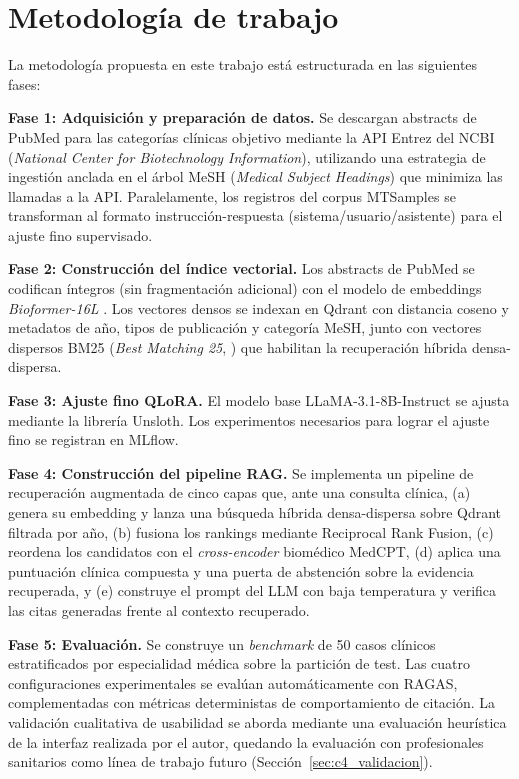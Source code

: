 \documentclass[11pt,a4paper,spanish]{book}
\numberwithin{equation}{chapter}
\numberwithin{figure}{chapter}
\begin{document}
\section{Metodología de trabajo}

La metodología propuesta en este trabajo está estructurada en las siguientes fases:

\textbf{Fase 1: Adquisición y preparación de datos.} Se descargan abstracts de PubMed para las categorías clínicas objetivo mediante la API Entrez del NCBI (\textit{National Center for Biotechnology Information}), utilizando una estrategia de ingestión anclada en el árbol MeSH (\textit{Medical Subject Headings}) que minimiza las llamadas a la API. Paralelamente, los registros del corpus MTSamples se transforman al formato instrucción-respuesta (sistema/usuario/asistente) para el ajuste fino supervisado.

\textbf{Fase 2: Construcción del índice vectorial.} Los abstracts de PubMed se codifican íntegros (sin fragmentación adicional) con el modelo de embeddings \textit{Bioformer-16L} \cite{fang2023bioformerefficienttransformerlanguage}. Los vectores densos se indexan en Qdrant con distancia coseno y metadatos de año, tipos de publicación y categoría MeSH, junto con vectores dispersos BM25 (\textit{Best Matching 25}, \cite{robertson2009bm25}) que habilitan la recuperación híbrida densa-dispersa.

\textbf{Fase 3: Ajuste fino QLoRA.} El modelo base LLaMA-3.1-8B-Instruct se ajusta mediante la librería Unsloth. Los experimentos necesarios para lograr el ajuste fino se registran en MLflow.

\textbf{Fase 4: Construcción del pipeline RAG.} Se implementa un pipeline de recuperación augmentada de cinco capas que, ante una consulta clínica, (a) genera su embedding y lanza una búsqueda híbrida densa-dispersa sobre Qdrant filtrada por año, (b) fusiona los rankings mediante Reciprocal Rank Fusion, (c) reordena los candidatos con el \textit{cross-encoder} biomédico MedCPT, (d) aplica una puntuación clínica compuesta y una puerta de abstención sobre la evidencia recuperada, y (e) construye el prompt del LLM con baja temperatura y verifica las citas generadas frente al contexto recuperado.

\textbf{Fase 5: Evaluación.} Se construye un \textit{benchmark} de 50 casos clínicos estratificados por especialidad médica sobre la partición de test. Las cuatro configuraciones experimentales se evalúan automáticamente con RAGAS, complementadas con métricas deterministas de comportamiento de citación. La validación cualitativa de usabilidad se aborda mediante una evaluación heurística de la interfaz realizada por el autor, quedando la evaluación con profesionales sanitarios como línea de trabajo futuro (Sección~\ref{sec:c4_validacion}).
\end{document}
